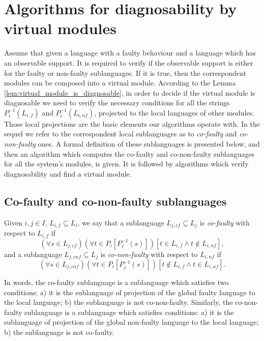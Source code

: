 \documentclass[a4paper, 10pt, conference]{ieeeconf}
\begin{document}
\section{Algorithms for diagnosability by virtual modules}
\label{sec:algorithms}

Assume that given a language with a faulty behaviour and a language which has an
observable support. It is required to verify if the observable support is
either for the faulty or non-faulty sublanguages. If it is true, then the
correspondent modules can be composed into a virtual module.
According to the Lemma \ref{lem:virtual_module_is_diagnosable}, in order to
decide if the virtual module is diagnosable we need to verify the necessary
conditions for all the strings $P_i^{-1}(L_{i,f})$ and $P_i^{-1}(L_{i,nf})$,
projected to the local languages of other modules. Those local projections are
the basic elements our algorithms operate with. In the sequel we
refer to the correspondent local sublanguages as to \emph{co-faulty} and
\emph{co-non-faulty} ones. A formal definition of these sublanguages is
presented below, and then an algorithm which computes the co-faulty
and co-non-faulty sublanguages for all the system's modules, is given. It is
followed by algorithms which verify diagnosability and find a virtual module.

\subsection{Co-faulty and co-non-faulty sublanguages}

\begin{definition}
\label{def:co-faulty}
Given $i, j \in I$, $L_{i,f} \subseteq L_i$,
we say that a sublanguage $L_{j,cf} \subseteq L_j$ is \emph{co-faulty} with
respect to $L_{i,f}$ if 
$$
	(\forall s \in L_{j,cf})(\forall t \in P_i[P_j^{-1}(s)])
	\left[
		t \in L_{i,f} \land t \not \in L_{i,nf}   
	\right],
$$ 
and a sublanguage $L_{j,cnf} \subseteq L_j$ is
\emph{co-non-faulty} with respect to $L_{i,nf}$ if 
$$
	(\forall s \in L_{j,cnf})(\forall t \in P_i[P_j^{-1}(s)])
	\left[
		t \not \in L_{i,f} \land t \in L_{i,nf}   
	\right].
$$ 
\end{definition}

In words, the co-faulty sublanguage is a sublanguage which satisfies two
conditions:
a) it is the sublanguage of projection of the global faulty language
to the local language; b) the sublanguage is not co-non-faulty.
Similarly, the co-non-faulty sublanguage is a sublanguage which satisfies
conditions:
a) it is the sublanguage of projection of the global non-faulty language
to the local language; b) the sublanguage is not co-faulty.
\end{document}
